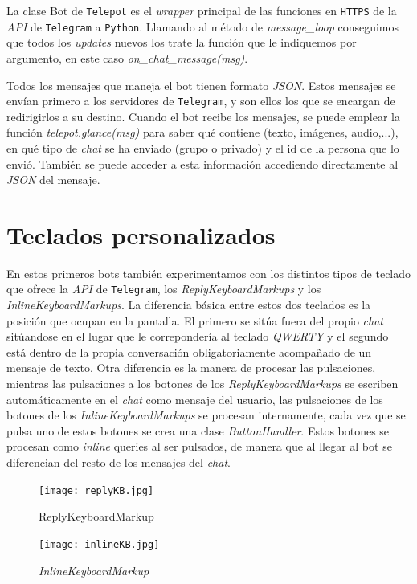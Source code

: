 \documentclass[oneside]{memoir}
\begin{document}


La clase Bot de \texttt{Telepot} es el \textit{wrapper} principal de las funciones en \texttt{HTTPS} de la \textit{API} de \texttt{Telegram} a \texttt{Python}. Llamando al método de \textit{message\_loop} conseguimos que todos los \textit{updates} nuevos los trate la función que le indiquemos por argumento, en este caso \textit{on\_chat\_message(msg)}.

Todos los mensajes que maneja el bot tienen formato \textit{JSON}. Estos mensajes se envían primero a los servidores de \texttt{Telegram}, y son ellos los que se encargan de redirigirlos a su destino. Cuando el bot recibe los mensajes, se puede emplear la función \textit{telepot.glance(msg)} para saber qué contiene (texto, imágenes, audio,...), en qué tipo de \textit{chat} se ha enviado (grupo o privado) y el id de la persona que lo envió. También se puede acceder a esta información accediendo directamente al \textit{JSON} del mensaje.


\section{Teclados personalizados}
En estos primeros bots también experimentamos con los distintos tipos de teclado que ofrece la \textit{API} de \texttt{Telegram}, los \textit{ReplyKeyboardMarkups} y los \textit{InlineKeyboardMarkups}. La diferencia básica entre estos dos teclados es la posición que ocupan en la pantalla. El primero se sitúa fuera del propio \textit{chat} sitúandose en el lugar que le correpondería al teclado \textit{QWERTY} y el segundo está dentro de la propia conversación obligatoriamente acompañado de un mensaje de texto. Otra diferencia es la manera de procesar las pulsaciones, mientras las pulsaciones a los botones de los \textit{ReplyKeyboardMarkups} se escriben automáticamente en el \textit{chat} como mensaje del usuario, las pulsaciones de los botones de los \textit{InlineKeyboardMarkups} se procesan internamente, cada vez que se pulsa uno de estos botones se crea una clase \textit{ButtonHandler}. Estos botones se procesan como \textit{inline} queries al ser pulsados, de manera que al llegar al bot se diferencian del resto de los mensajes del \textit{chat}.

\begin{figure}[h!]
\centering
\begin{minipage}{6cm}
  \centering
  \texttt{[image: replyKB.jpg]}
  \caption{ReplyKeyboardMarkup}
  \label{fig:ReplyKeyboardMarkup}
\end{minipage}%
\begin{minipage}{6cm}
  \centering
  \texttt{[image: inlineKB.jpg]}
  \caption{\textit{InlineKeyboardMarkup}}
  \label{fig:InlineKeyboardMarkups}
\end{minipage}
\end{figure}
\end{document}
